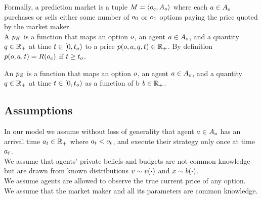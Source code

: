 Formally, a prediction market is a tuple $M = 
\left<o_c, A_o \right>$ where each  
$a\in A_o$ purchases or sells
either some number of $o_0$ or $o_1$ options paying the price quoted by the 
market maker.\\

A  $p_K$ is a function 
that maps an option $o$, an agent $a \in A_o$, 
and a quantity $q\in\mathbb{R}_+$ at time $t \in [0,t_o)$ 
to a price $p(o,a,q,t) \in \mathbb{R}_+$. 
By definition $p(o,a, t) = R(o_e)$ if 
$t \ge t_o$.

An  $p_Z$ is a function
that maps an option $o$, an agent $a \in A_o$, and
a quantity $q\in\mathbb{R}_+$ at time $t \in [0,t_o)$ as a function of b $b\in\mathbb{R}_+$.

\subsection{Assumptions}

In our model we assume without loss of generality that agent $a \in A_o$ has an arrival time 
$a_t \in \mathbb{R}_+$ where $a_t < o_t$, 
and execute their strategy only once at time $a_t$.\\

We assume that agents' private beliefs and budgets are not common knowledge
but are drawn from known distributions $v \sim v(\cdot)$ and
$x \sim b(\cdot)$.\\

We assume agents are allowed to observe the true current price of any option.\\

We assume that the market maker and all its parameters are common knowledge.\\
